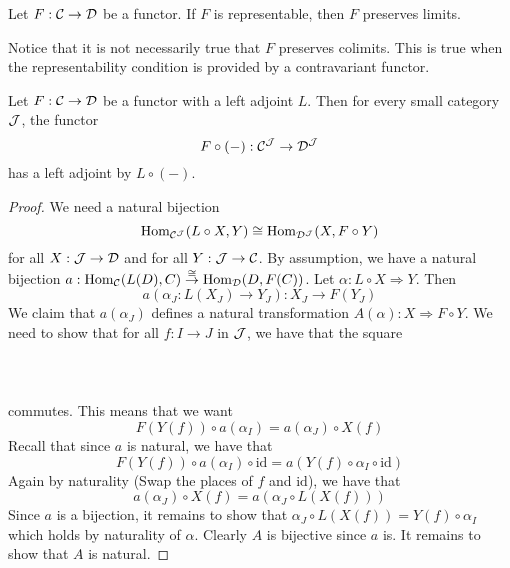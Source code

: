 \documentclass[a4paper]{article}
\begin{document}
\begin{prp}{}{} Let $F:\mathcal{C}\to\mathcal{D}$ be a functor. If $F$ is representable, then $F$ preserves limits. 
\end{prp}

Notice that it is not necessarily true that $F$ preserves colimits. This is true when the representability condition is provided by a contravariant functor. 

\begin{lmm}{}{} Let $F:\mathcal{C}\to\mathcal{D}$ be a functor with a left adjoint $L$. Then for every small category $\mathcal{J}$, the functor $$F\circ(-):\mathcal{C}^{\mathcal{J}}\to\mathcal{D}^{\mathcal{J}}$$ has a left adjoint by $L\circ(-)$. \tcbline
\begin{proof}
We need a natural bijection $$\operatorname{Hom}_{\mathcal{C}^{\mathcal{J}}}(L\circ X,Y)\cong\operatorname{Hom}_{\mathcal{D}^{\mathcal{J}}}(X,F\circ Y)$$ for all $X:\mathcal{J}\to\mathcal{D}$ and for all $Y:\mathcal{J}\to\mathcal{C}$. By assumption, we have a natural bijection $a:\operatorname{Hom}_{\mathcal{C}}(L(D),C)\overset{\cong}{\to}\operatorname{Hom}_{\mathcal{D}}(D,F(C))$. Let $\alpha:L\circ X\Rightarrow Y$. Then $$a(\alpha_J:L(X_J)\to Y_J):X_J\to F(Y_J)$$ We claim that $a(\alpha_J)$ defines a natural transformation $A(\alpha):X\Rightarrow F\circ Y$. We need to show that for all $f:I\to J$ in $\mathcal{J}$, we have that the square \\~\\
 \\~\\
commutes. This means that we want $$F(Y(f))\circ a(\alpha_I)=a(\alpha_J)\circ X(f)$$ Recall that since $a$ is natural, we have that $$F(Y(f))\circ a(\alpha_I)\circ\text{id}=a(Y(f)\circ\alpha_I\circ\text{id})$$ Again by naturality (Swap the places of $f$ and $\text{id}$), we have that $$a(\alpha_J)\circ X(f)=a(\alpha_J\circ L(X(f)))$$ Since $a$ is a bijection, it remains to show that $\alpha_J\circ L(X(f))=Y(f)\circ\alpha_I$ which holds by naturality of $\alpha$. Clearly $A$ is bijective since $a$ is. It remains to show that $A$ is natural. 
\end{proof}
\end{lmm}
\end{document}
